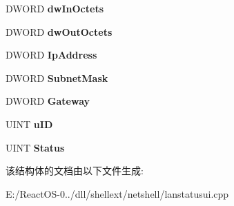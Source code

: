 \begin{DoxyCompactItemize}
D\+W\+O\+RD {\bfseries dw\+In\+Octets}
\item 
\mbox{\label{struct_l_a_n_s_t_a_t_u_s_u_i___c_o_n_t_e_x_t_a47ec5d93ed785a65202aff12d26d337f}} 
D\+W\+O\+RD {\bfseries dw\+Out\+Octets}
\item 
\mbox{\label{struct_l_a_n_s_t_a_t_u_s_u_i___c_o_n_t_e_x_t_a791883173e035ffffc2f6e8bc91f6490}} 
D\+W\+O\+RD {\bfseries Ip\+Address}
\item 
\mbox{\label{struct_l_a_n_s_t_a_t_u_s_u_i___c_o_n_t_e_x_t_a62342f0cd8fc30ccaae30a62302efcdc}} 
D\+W\+O\+RD {\bfseries Subnet\+Mask}
\item 
\mbox{\label{struct_l_a_n_s_t_a_t_u_s_u_i___c_o_n_t_e_x_t_a54e95b2a1c4ac607b50cb62d23676b2f}} 
D\+W\+O\+RD {\bfseries Gateway}
\item 
\mbox{\label{struct_l_a_n_s_t_a_t_u_s_u_i___c_o_n_t_e_x_t_a75898934a4c5638823cc5f0c056b6942}} 
U\+I\+NT {\bfseries u\+ID}
\item 
\mbox{\label{struct_l_a_n_s_t_a_t_u_s_u_i___c_o_n_t_e_x_t_a19eceaefca84f308fa6b0b07c7897b77}} 
U\+I\+NT {\bfseries Status}
\end{DoxyCompactItemize}


该结构体的文档由以下文件生成\+:\begin{DoxyCompactItemize}
\item 
E\+:/\+React\+O\+S-\/0../dll/shellext/netshell/lanstatusui.\+cpp\end{DoxyCompactItemize}
